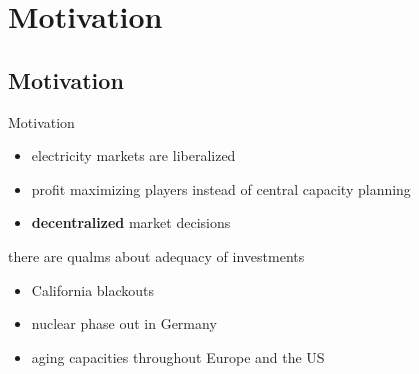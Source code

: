 \section{Motivation}
\subsection{Motivation}

\begin{frame}{Motivation}

\begin{itemize}
	\item electricity markets are liberalized
	\item profit maximizing players instead of central capacity planning 
	\item \textbf{decentralized} market decisions
\end{itemize}	

there are qualms about adequacy of investments
	
\begin{itemize}
	\item California blackouts
	\item nuclear phase out in Germany
	\item aging capacities throughout Europe and the US
\end{itemize}

\end{frame}

